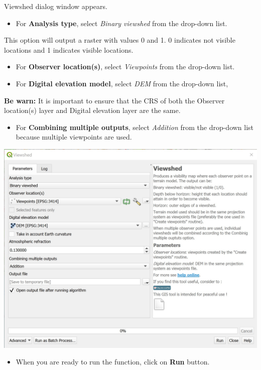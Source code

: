 \documentclass[
  letterpaper,
  DIV=11,
  numbers=noendperiod]{scrreprt}
\providecommand{\tightlist}{%
  \setlength{\itemsep}{0pt}\setlength{\parskip}{0pt}}\usepackage{longtable,booktabs,array}
\begin{document}
Viewshed dialog window appears.

\begin{itemize}
\tightlist
\item
  For \textbf{Analysis type}, select \emph{Binary viewshed} from the
  drop-down list.
\end{itemize}

This option will output a raster with values 0 and 1. 0 indicates not
visible locations and 1 indicates visible locations.

\begin{itemize}
\item
  For \textbf{Observer location(s)}, select \emph{Viewpoints} from the
  drop-down list.
\item
  For \textbf{Digital elevation model}, select \emph{DEM} from the
  drop-down list,
\end{itemize}

\textbf{Be warn:} It is important to ensure that the CRS of both the
Observer location(s) layer and Digital elevation layer are the same.

\begin{itemize}
\tightlist
\item
  For \textbf{Combining multiple outputs}, select \emph{Addition} from
  the drop-down list because multiple viewpoints are used.
\end{itemize}

\includegraphics{./img06/image64.jpg}

\begin{itemize}
\tightlist
\item
  When you are ready to run the function, click on \textbf{Run} button.
\end{itemize}
\end{document}
